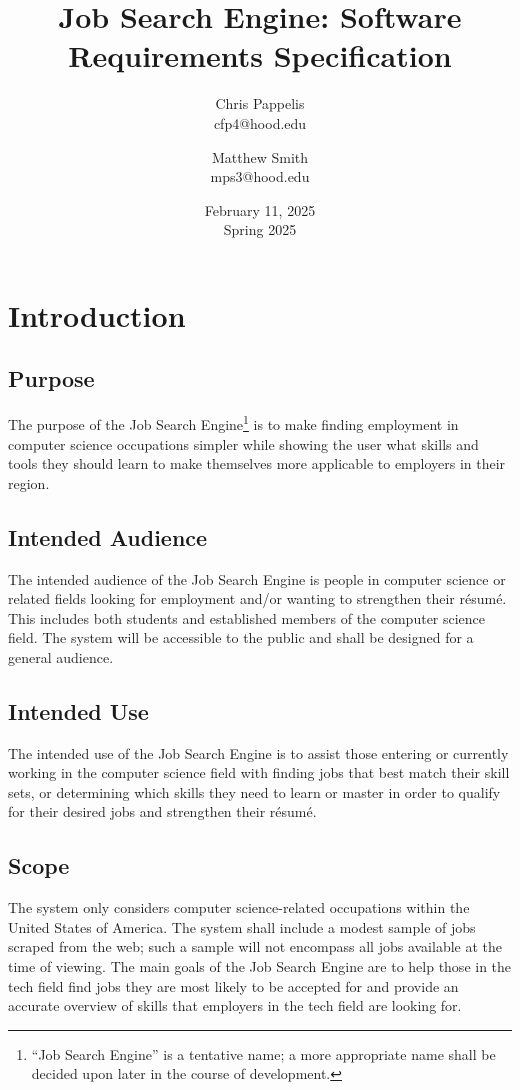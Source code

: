 \documentclass[titlepage]{article}
\title{Job Search Engine: Software Requirements Specification}
\author{
    Chris Pappelis\\
    cfp4@hood.edu
    \and
    Matthew Smith\\
    mps3@hood.edu
}
\date{February 11, 2025\\Spring 2025}
\begin{document}
\maketitle

\section{Introduction}

\subsection{Purpose}
The purpose of the Job Search Engine\footnote{``Job Search Engine'' is a tentative name; a more appropriate name shall be decided upon later in the course of development.} is to make finding employment in computer science occupations simpler while showing the user what skills and tools they should learn to make themselves more applicable to employers in their region.

\subsection{Intended Audience}
The intended audience of the Job Search Engine is people in computer science or related fields looking for employment and/or wanting to strengthen their r\'esum\'e. This includes both students and established members of the computer science field. The system will be accessible to the public and shall be designed for a general audience.

\subsection{Intended Use}
The intended use of the Job Search Engine is to assist those entering or currently working in the computer science field with finding jobs that best match their skill sets, or determining which skills they need to learn or master in order to qualify for their desired jobs and strengthen their r\'esum\'e.

\subsection{Scope}
The system only considers computer science-related occupations within the United States of America. The system shall include a modest sample of jobs scraped from the web; such a sample will not encompass all jobs available at the time of viewing. The main goals of the Job Search Engine are to help those in the tech field find jobs they are most likely to be accepted for and provide an accurate overview of skills that employers in the tech field are looking for.
\end{document}
